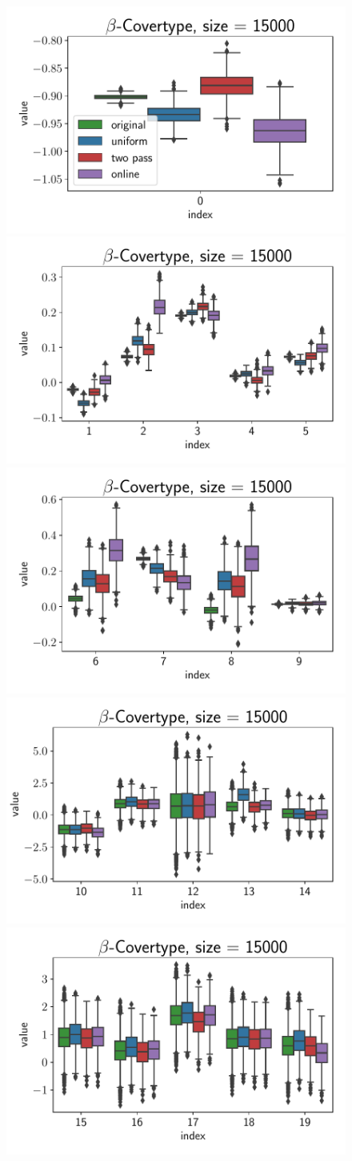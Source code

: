 \begin{figure}[ht!]
    \centering
    \includegraphics[width=.49\linewidth]{figures/covertype_coefficients/covertype_coefficients_0.pdf}
    \includegraphics[width=.49\linewidth]{figures/covertype_coefficients/covertype_coefficients_1.pdf}
    \includegraphics[width=.49\linewidth]{figures/covertype_coefficients/covertype_coefficients_6.pdf}
    \includegraphics[width=.49\linewidth]{figures/covertype_coefficients/covertype_coefficients_10.pdf}
    \includegraphics[width=.49\linewidth]{figures/covertype_coefficients/covertype_coefficients_15.pdf}

\end{figure}
